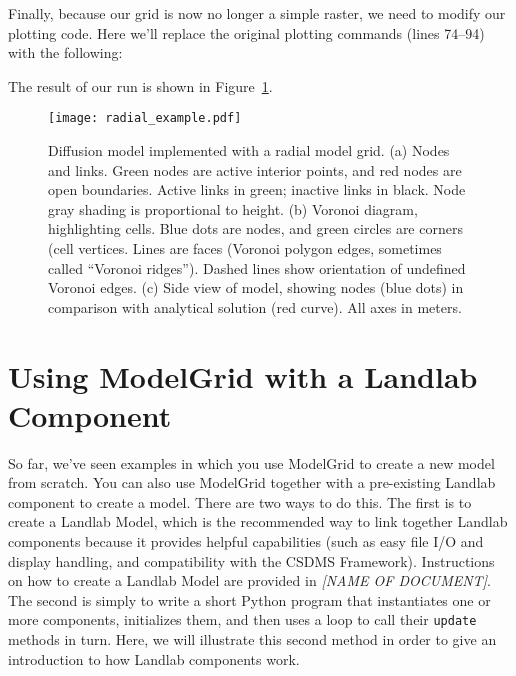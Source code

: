 \documentclass[12pt]{article}
\newcommand{\code}[1]{{\tt #1}}
\begin{document}

Finally, because our grid is now no longer a simple raster, we need to modify our plotting code. Here we'll replace the original plotting commands (lines 74--94) with the following:


The result of our run is shown in Figure~\ref{radialdiffusion}.

 \begin{figure}[h!]
    \centering
    \texttt{[image: radial\_example.pdf]}
    \caption{Diffusion model implemented with a radial model grid. (a) Nodes and links. Green nodes are active interior points, and red nodes are open boundaries. Active links in green; inactive links in black. Node gray shading is proportional to height. (b) Voronoi diagram, highlighting cells. Blue dots are nodes, and green circles are corners (cell vertices. Lines are faces (Voronoi polygon edges, sometimes called ``Voronoi ridges''). Dashed lines show orientation of undefined Voronoi edges. (c) Side view of model, showing nodes (blue dots) in comparison with analytical solution (red curve). All axes in meters.}
   \label{radialdiffusion}
\end{figure}




\section{Using ModelGrid with a Landlab Component}

So far, we've seen examples in which you use ModelGrid to create a new model from scratch. You can also use ModelGrid together with a pre-existing Landlab component to create a model. There are two ways to do this. The first is to create a Landlab Model, which is the recommended way to link together Landlab components because it provides helpful capabilities (such as easy file I/O and display handling, and compatibility with the CSDMS Framework). Instructions on how to create a Landlab Model are provided in {\em [NAME OF DOCUMENT]}. The second is simply to write a short Python program that instantiates one or more components, initializes them, and then uses a loop to call their \code{update} methods in turn. Here, we will illustrate this second method in order to give an introduction to how Landlab components work.
\end{document}

